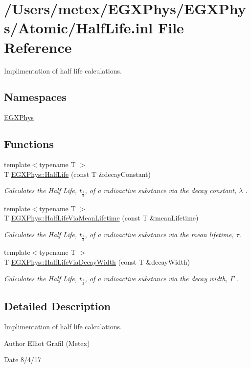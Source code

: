 \hypertarget{_half_life_8inl}{}\section{/\+Users/metex/\+E\+G\+X\+Phys/\+E\+G\+X\+Phys/\+Atomic/\+Half\+Life.inl File Reference}
\label{_half_life_8inl}


Implimentation of half life calculations.  


\subsection*{Namespaces}
\begin{DoxyCompactItemize}
\item 
 \hyperlink{namespace_e_g_x_phys}{E\+G\+X\+Phys}
\end{DoxyCompactItemize}
\subsection*{Functions}
\begin{DoxyCompactItemize}
\item 
{\footnotesize template$<$typename T $>$ }\\T \hyperlink{group___half_life_ga21d268f154fb91c1c556bbfa7fe83ac1}{E\+G\+X\+Phys\+::\+Half\+Life} (const T \&decay\+Constant)
\begin{DoxyCompactList}\small\item\em Calculates the Half Life, $t_{\frac{1}{2}}$, of a radioactive substance via the decay constant, $\lambda$ . \end{DoxyCompactList}\item 
{\footnotesize template$<$typename T $>$ }\\T \hyperlink{group___half_life_gacddef16b62e98b214ec8dd8af7da7dce}{E\+G\+X\+Phys\+::\+Half\+Life\+Via\+Mean\+Lifetime} (const T \&mean\+Lifetime)
\begin{DoxyCompactList}\small\item\em Calculates the Half Life, $t_{\frac{1}{2}}$, of a radioactive substance via the mean lifetime, $\tau$. \end{DoxyCompactList}\item 
{\footnotesize template$<$typename T $>$ }\\T \hyperlink{group___half_life_gaba3fda944d1a68ee1016a1f2f5809359}{E\+G\+X\+Phys\+::\+Half\+Life\+Via\+Decay\+Width} (const T \&decay\+Width)
\begin{DoxyCompactList}\small\item\em Calculates the Half Life, $t_{\frac{1}{2}}$, of a radioactive substance via the decay width, $\Gamma$ . \end{DoxyCompactList}\end{DoxyCompactItemize}


\subsection{Detailed Description}
Implimentation of half life calculations. 

\begin{DoxyAuthor}{Author}
Elliot Grafil (Metex) 
\end{DoxyAuthor}
\begin{DoxyDate}{Date}
8/4/17 
\end{DoxyDate}
